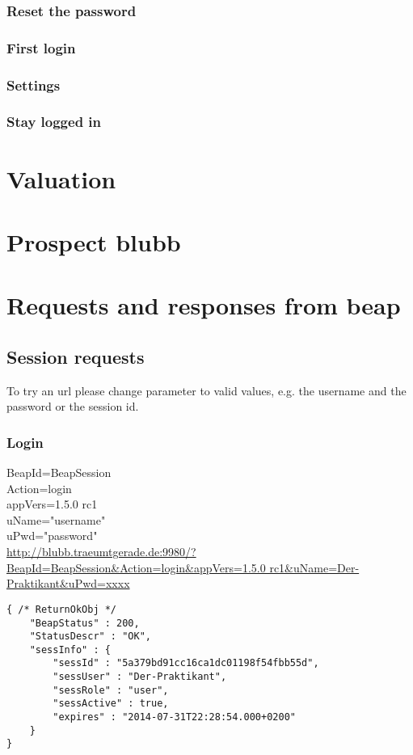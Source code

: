 \documentclass[12pt,a4paper,oneside]{report}
\begin{document}
\subsection{Reset the password}

\subsection{First login}

\subsection{Settings}

\subsection{Stay logged in}

\chapter{Valuation}

\chapter{Prospect blubb}

\printbibliography
%

\appendix
\chapter{Requests and responses from beap}
\lstset{language=JavaScript}
\section{Session requests}
To try an url please change parameter to valid values, e.g. the username and the password or the session id.
\subsection{Login}
BeapId=BeapSession\\
Action=login\\
appVers=1.5.0 rc1\\
uName="username"\\
uPwd="password"\\
\url{http://blubb.traeumtgerade.de:9980/?BeapId=BeapSession&Action=login&appVers=1.5.0 rc1&uName=Der-Praktikant&uPwd=xxxx}
\lstset{language=JavaScript}
\begin{lstlisting}
{ /* ReturnOkObj */
    "BeapStatus" : 200,
    "StatusDescr" : "OK",
    "sessInfo" : { 
        "sessId" : "5a379bd91cc16ca1dc01198f54fbb55d",
        "sessUser" : "Der-Praktikant",
        "sessRole" : "user",
        "sessActive" : true,
        "expires" : "2014-07-31T22:28:54.000+0200"
    }
}
\end{lstlisting}
\clearpage
\end{document}
